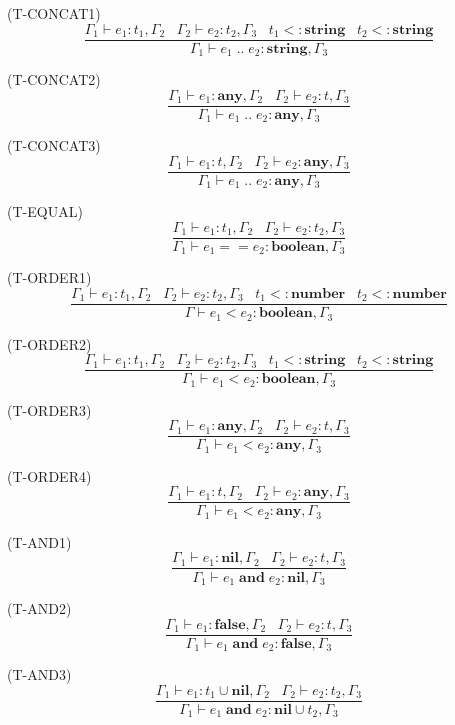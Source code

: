 \documentclass{paper}
\newcommand{\Any}{\mathbf{any}}
\newcommand{\Nil}{\mathbf{nil}}
\newcommand{\False}{\mathbf{false}}
\newcommand{\Boolean}{\mathbf{boolean}}
\newcommand{\Number}{\mathbf{number}}
\newcommand{\String}{\mathbf{string}}
\newcommand{\mylabel}[1]{\; (\textsc{#1})}
\newcommand{\env}{\Gamma}
\newcommand{\subtype}{<:}
\begin{document}
\mylabel{T-CONCAT1}
\[
\dfrac{\env_{1} \vdash e_{1}:t_{1}, \env_{2} \;\;\;
       \env_{2} \vdash e_{2}:t_{2}, \env_{3} \;\;\;
       t_{1} \subtype \String \;\;\;
       t_{2} \subtype \String}
      {\env_{1} \vdash e_{1} \; {..} \; e_{2}:\String, \env_{3}}
\]

\mylabel{T-CONCAT2}
\[
\dfrac{\env_{1} \vdash e_{1}:\Any, \env_{2} \;\;\;
       \env_{2} \vdash e_{2}:t, \env_{3}}
      {\env_{1} \vdash e_{1} \; {..} \; e_{2}:\Any, \env_{3}}
\]

\mylabel{T-CONCAT3}
\[
\dfrac{\env_{1} \vdash e_{1}:t, \env_{2} \;\;\;
       \env_{2} \vdash e_{2}:\Any, \env_{3}}
      {\env_{1} \vdash e_{1} \; {..} \; e_{2}:\Any, \env_{3}}
\]

\mylabel{T-EQUAL}
\[
\dfrac{\env_{1} \vdash e_{1}:t_{1}, \env_{2} \;\;\;
       \env_{2} \vdash e_{2}:t_{2}, \env_{3}}
      {\env_{1} \vdash e_{1} == e_{2}:\Boolean, \env_{3}}
\]

\mylabel{T-ORDER1}
\[
\dfrac{\env_{1} \vdash e_{1}:t_{1}, \env_{2} \;\;\;
       \env_{2} \vdash e_{2}:t_{2}, \env_{3} \;\;\;
       t_{1} \subtype \Number \;\;\;
       t_{2} \subtype \Number}
      {\env \vdash e_{1} < e_{2}:\Boolean, \env_{3}}
\]

\mylabel{T-ORDER2}
\[
\dfrac{\env_{1} \vdash e_{1}:t_{1}, \env_{2} \;\;\;
       \env_{2} \vdash e_{2}:t_{2}, \env_{3} \;\;\;
       t_{1} \subtype \String \;\;\;
       t_{2} \subtype \String}
      {\env_{1} \vdash e_{1} < e_{2}:\Boolean, \env_{3}}
\]

\mylabel{T-ORDER3}
\[
\dfrac{\env_{1} \vdash e_{1}:\Any, \env_{2} \;\;\;
       \env_{2} \vdash e_{2}:t, \env_{3}}
      {\env_{1} \vdash e_{1} < e_{2}:\Any, \env_{3}}
\]

\mylabel{T-ORDER4}
\[
\dfrac{\env_{1} \vdash e_{1}:t, \env_{2} \;\;\;
       \env_{2} \vdash e_{2}:\Any, \env_{3}}
      {\env_{1} \vdash e_{1} < e_{2}:\Any, \env_{3}}
\]

\mylabel{T-AND1}
\[
\dfrac{\env_{1} \vdash e_{1}:\Nil, \env_{2} \;\;\;
       \env_{2} \vdash e_{2}:t, \env_{3}}
      {\env_{1} \vdash e_{1} \; \mathbf{and} \; e_{2}:\Nil, \env_{3}}
\]

\mylabel{T-AND2}
\[
\dfrac{\env_{1} \vdash e_{1}:\False, \env_{2} \;\;\;
       \env_{2} \vdash e_{2}:t, \env_{3}}
      {\env_{1} \vdash e_{1} \; \mathbf{and} \; e_{2}:\False, \env_{3}}
\]

\mylabel{T-AND3}
\[
\dfrac{\env_{1} \vdash e_{1}:t_{1} \cup \Nil, \env_{2} \;\;\;
       \env_{2} \vdash e_{2}:t_{2}, \env_{3}}
      {\env_{1} \vdash e_{1} \; \mathbf{and} \; e_{2}:\Nil \cup t_{2}, \env_{3}}
\]
\end{document}
